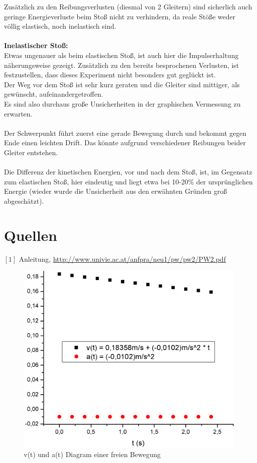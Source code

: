 \documentclass[12pt,a4paper]{article}
\begin{document}
\begin{multicols}{2}
Zusätzlich zu den Reibungsverlusten (diesmal von 2 Gleitern) sind sicherlich auch geringe Energieverluste beim Stoß nicht zu verhindern, da reale Stöße weder völlig elastisch, noch inelastisch sind.\\
\\
\textbf{Inelastischer Stoß:}\\
Etwas ungenauer als beim elastischen Stoß, ist auch hier die Impulserhaltung näherungsweise gezeigt. Zusätzlich zu den bereits besprochenen Verlusten, ist festzustellen, dass dieses Experiment nicht besonders gut geglückt ist.\\
Der Weg vor dem Stoß ist sehr kurz geraten und die Gleiter sind mittiger, als gewünscht, aufeinandergetroffen.\\
Es sind also durchaus große Unsicherheiten in der graphischen Vermessung zu erwarten.\\
\\
Der Schwerpunkt führt zuerst eine gerade Bewegung durch und bekommt gegen Ende einen leichten Drift. Das könnte aufgrund verschiedener Reibungen beider Gleiter entstehen.\\
\\
Die Differenz der kinetischen Energien, vor und nach dem Stoß, ist, im Gegensatz zum elastischen Stoß, hier eindeutig und liegt etwa bei 10-20\% der ursprünglichen Energie (wieder wurde die Unsicherheit aus den erwähnten Gründen groß abgeschätzt).




\section{Quellen}
$[1]$ Anleitung, \url{http://www.univie.ac.at/anfpra/neu1/pw/pw2/PW2.pdf}\\
\end{multicols}

\begin{figure}[H]
	\centering
	\includegraphics[scale=0.4]{./figure/v(t)_a(t)_diagram_freie_bew.png}
	\caption{v(t) und a(t) Diagram einer freien Bewegung}
	\label{fig:v_t_a_t_freie_bew}
\end{figure}
\end{document}
